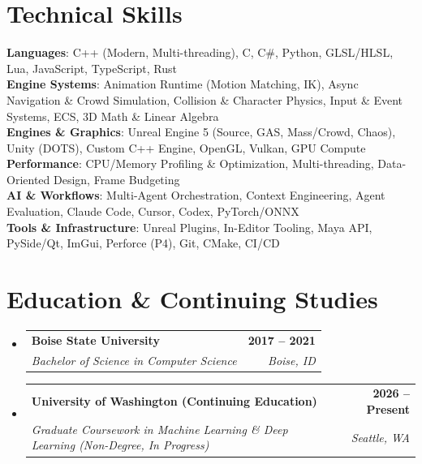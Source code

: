 \documentclass[letterpaper,11pt]{article}
\makeatletter
\newcommand{\resumeSubheading}[4]{
  \vspace{-2pt}\item
    \begin{tabular*}{1.0\textwidth}[t]{l@{\extracolsep{\fill}}r}
      \textbf{#1} & \textbf{\small #2} \\
      \textit{\small#3} & \textit{\small #4} \\
    \end{tabular*}\vspace{-7pt}
}
\newcommand{\resumeSubHeadingListStart}{\begin{itemize}[leftmargin=0.0in, label={}]}
\newcommand{\resumeSubHeadingListEnd}{\end{itemize}}
\makeatother
\begin{document}
\section{Technical Skills}
 \begin{itemize}[leftmargin=0.15in, label={}]
    \small{\item{
     \textbf{Languages}{: C++ (Modern, Multi-threading), C, C\#, Python, GLSL/HLSL, Lua, JavaScript, TypeScript, Rust} \\
     \textbf{Engine Systems}{: Animation Runtime (Motion Matching, IK), Async Navigation \& Crowd Simulation, Collision \& Character Physics, Input \& Event Systems, ECS, 3D Math \& Linear Algebra} \\
     \textbf{Engines \& Graphics}{: Unreal Engine 5 (Source, GAS, Mass/Crowd, Chaos), Unity (DOTS), Custom C++ Engine, OpenGL, Vulkan, GPU Compute} \\
     \textbf{Performance}{: CPU/Memory Profiling \& Optimization, Multi-threading, Data-Oriented Design, Frame Budgeting} \\
     \textbf{AI \& Workflows}{: Multi-Agent Orchestration, Context Engineering, Agent Evaluation, Claude Code, Cursor, Codex, PyTorch/ONNX} \\
     \textbf{Tools \& Infrastructure}{: Unreal Plugins, In-Editor Tooling, Maya API, PySide/Qt, ImGui, Perforce (P4), Git, CMake, CI/CD}
    }}
 \end{itemize}
 \vspace{-12pt}

\section{Education \& Continuing Studies}
  \resumeSubHeadingListStart
    \resumeSubheading
      {Boise State University}{2017 -- 2021}
      {Bachelor of Science in Computer Science}{Boise, ID}
    \resumeSubheading
      {University of Washington (Continuing Education)}{2026 -- Present}
      {Graduate Coursework in Machine Learning \& Deep Learning (Non-Degree, In Progress)}{Seattle, WA}
  \resumeSubHeadingListEnd
\end{document}
